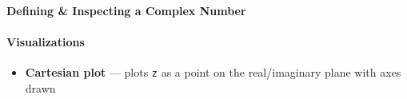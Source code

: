 \paragraph{Defining \& Inspecting a Complex
Number}\label{defining-inspecting-a-complex-number}

\begin{Shaded}
\begin{Highlighting}[]
\OperatorTok{=}  \OperatorTok{+} 
\end{Highlighting}
\end{Shaded}

\paragraph{Visualizations}\label{visualizations}

\begin{itemize}
\tightlist
\item
  \textbf{Cartesian plot} --- plots \texttt{z} as a point on the
  real/imaginary plane with axes drawn
\end{itemize}

\begin{Shaded}
\begin{Highlighting}[]
\NormalTok{)}

\NormalTok{plt.xlim([}\OperatorTok{{-}}\NormalTok{,}\NormalTok{])}
\NormalTok{plt.ylim([}\OperatorTok{{-}}\NormalTok{,}\NormalTok{])}
\NormalTok{plt.plot([}\OperatorTok{{-}}\NormalTok{,}\NormalTok{], [}\NormalTok{,}\NormalTok{],}\NormalTok{)}
\NormalTok{plt.plot([}\NormalTok{,}\NormalTok{], [}\OperatorTok{{-}}\NormalTok{,}\NormalTok{],}\NormalTok{)}
\NormalTok{)}
\NormalTok{)}
\end{Highlighting}
\end{Shaded}


